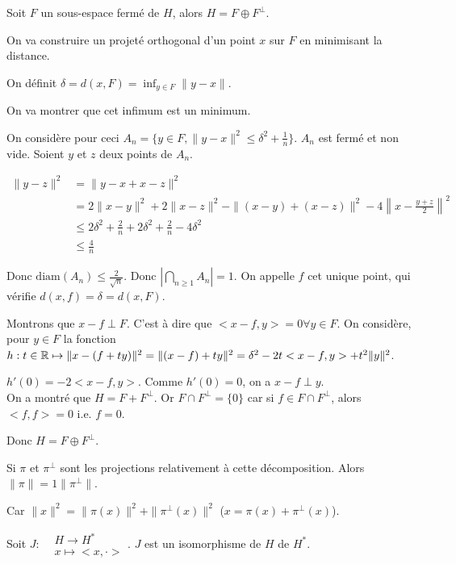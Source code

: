 \documentclass[10pt,a4paper,notitlepage ]{report}
\begin{document}
\begin{theorem}
	Soit $F$ un sous-espace fermé de $H$, alors $H=F\oplus F^\perp$.
\end{theorem}

\begin{demo}
	On va construire un projeté orthogonal d'un point $x$ sur $F$ en minimisant la distance.
	
	On définit $\delta = d(x,F) = \inf_{y\in F} \|y-x\|$.
	
	On va montrer que cet infimum est un minimum.
	
	On considère pour ceci $A_n = \{y\in F, \|y-x\|^2 \le \delta^2 + \frac 1 n\}$. $A_n$ est fermé et non vide.
	Soient $y$ et $z$ deux points de $A_n$.
	
	\[\begin{aligned}
		\|y-z\|^2 &= \| y-x + x-z \|^2 \\
		&= 2\|x-y\|^2 + 2\|x-z\|^2 - \|(x-y) + (x-z)\|^2 - 4\left\|x-\frac{y+z} 2\right\|^2 \\
		&\le 2\delta^2 + \frac 2 n + 2\delta^2 + \frac 2 n - 4\delta ^2\\
		&\le \frac 4 n
	\end{aligned} \]

	Donc $\mathrm{diam}(A_n) \le \frac 2 {\sqrt n}$. Donc $\left|\bigcap_{n\ge 1} A_n \right| = 1$. On appelle $f$ cet unique point, qui vérifie $d(x,f)=\delta=d(x,F)$.
	
	Montrons que $x-f \perp F$. C'est à dire que $<x-f,y>=0 \forall y\in F$. On considère, pour $y\in F$ la fonction $h:t\in\mathbb R \mapsto \|x-(f+ty)\|^2 = \|(x-f)+ty\|^2 = \delta^2 - 2t<x-f,y> + t^2\|y\|^2$.
	
	$h'(0) = -2<x-f,y>$. Comme $h'(0)=0$, on a $x-f\perp y$.
	\\
	
	On a montré que $H=F+F^\perp$. Or $F\cap F^\perp = \{0\}$ car si $f\in F\cap F^\perp$, alors $<f,f>=0$ i.e. $f=0$.
	
	Donc $H=F\oplus F^\perp$.
	
\end{demo}

\begin{rem}
	Si $\pi$ et $\pi^\perp$ sont les projections relativement à cette décomposition. Alors $\|\pi\| = 1 \|\pi^\perp\|$.
	
	Car $\|x\|^2  = \|\pi(x)\|^2 + \|\pi^\perp(x)\|^2$ ($x=\pi(x)+\pi^\perp(x)$).
\end{rem}

\begin{theorem}[Riesz]
	Soit $J :\begin{aligned} &H \rightarrow H^*\\ &x\mapsto <x,\cdot>\end{aligned}$. $J$ est un isomorphisme de $H$ de $H^*$.
\end{theorem}
\end{document}
